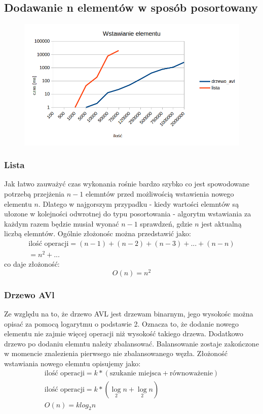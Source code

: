 \documentclass[]{article}
\begin{document}
	\subsection{Dodawanie n elementów w sposób posortowany}
		\begin{figure}[H]
			\includegraphics{insert.png}
		\end{figure}
		\subsubsection{Lista}
			Jak łatwo zauważyć czas wykonania rośnie bardzo szybko co jest spowodowane potrzebą przejżenia $ n-1 $ elemntów przed możliwością wstawienia nowego elementu $ n $. Dlatego w najgorszym przypadku - kiedy wartości elemntów są ułozone w kolejności odwrotnej do typu posortowania - algorytm wstawiania za każdym razem będzie musiał wyonać $n-1$ sprawdzeń, gdzie $n$ jest aktualną liczbą elemntów. Ogólnie złożonośc można przedstawić jako:
			\begin{multline}
			\text{ilość operacji} = (n-1) + (n-2) + (n-3) + ... + (n-n)  \\
			= n^2 + ...
			\end{multline}
			co daje złożoność:
			\[
			O(n) = n^2
			\]
		\subsubsection{Drzewo AVl}
			Ze względu na to, że drzewo AVL jest drzewam binarnym, jego wysokośc można opisać za pomocą logarytmu o podstawie 2. Oznacza to, że dodanie nowego elementu nie zajmie więcej operacji niż wysokość takiego drzewa. Dodatkowo drzewo po dodaniu elemntu należy zbalansować. Balansowanie zostaje zakończone w momencie znalezienia pierwsego nie zbalansowanego węzła. Złożoność wstawiania nowego elemntu opisujemy jako:
			\begin{equation}
				\begin{gathered}
				\text{ilość operacji} = k*(\text{szukanie miejsca} + \text{równoważenie}) \\
				
				\text{ilość operacji} = k*(\log\limits_{2}{n} + \log\limits_{2}{n}) \\
				
				O(n) = klog_2{n}
				\end{gathered}
			\end{equation}
			
\end{document}
